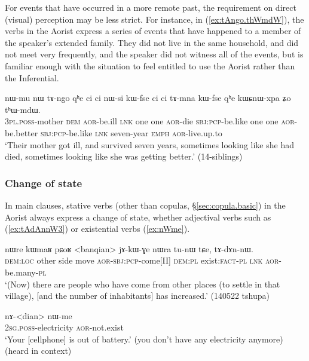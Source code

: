 For events that have occurred in a more remote past, the requirement on direct (visual) perception may be less strict. For instance, in (\ref{ex:tAngo.thWmdW}), the verbs in the Aorist express a series of events that have happened to a member of the speaker's extended family. They did not live in the same household, and did not meet very frequently, and the speaker did not witness all of the events, but is familiar enough with the situation to feel entitled to use the Aorist rather than the Inferential.

\begin{exe}
\ex \label{ex:tAngo.thWmdW}
 \gll nɯ-mu nɯ tɤ-ngo qʰe ci ci nɯ-si kɯ-fse ci ci tɤ-mna kɯ-fse qʰe kɯɕnɯ-xpa ʑo tʰɯ-mdɯ. \\
 \textsc{3pl}.\textsc{poss}-mother \textsc{dem} \textsc{aor}-be.ill \textsc{lnk} one one \textsc{aor}-die \textsc{sbj}:\textsc{pcp}-be.like  one one \textsc{aor}-be.better  \textsc{sbj}:\textsc{pcp}-be.like \textsc{lnk} seven-year \textsc{emph} \textsc{aor}-live.up.to \\
\glt `Their mother got ill, and survived seven years, sometimes looking like she had died, sometimes looking like she was getting better.' (14-siblings)
\end{exe}

\subsubsection{Change of state}   \label{sec:aor.inchoative}
In main clauses, stative verbs (other than copulas, §\ref{sec:copula.basic}) in the Aorist always express a change of state, whether adjectival verbs such as  (\ref{ex:tAdAnnW3}) or existential verbs (\ref{ex:nWme}).

\begin{exe}
\ex \label{ex:tAdAnnW3}
 \gll nɯre kɯmaʁ pɕoʁ <banqian> jɤ-kɯ-ɣe nɯra tu-nɯ tɕe, tɤ-dɤn-nɯ. \\
 \textsc{dem}:\textsc{loc} other side move \textsc{aor}-\textsc{sbj}:\textsc{pcp}-come[II] \textsc{dem}:\textsc{pl} exist:\textsc{fact}-\textsc{pl} \textsc{lnk} \textsc{aor}-be.many-\textsc{pl} \\
 \glt `(Now) there are people who have come from other places (to settle in that village), [and the number of inhabitants] has increased.' (140522 tshupa)
\end{exe}


\begin{exe}
\ex \label{ex:nWme}
 \gll nɤ-<dian> nɯ-me \\
 \textsc{2sg}.\textsc{poss}-electricity \textsc{aor}-not.exist \\
 \glt `Your [cellphone] is out of battery.' (you don't have any electricity anymore) (heard in context)
\end{exe}

